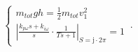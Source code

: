 \begin{equation}
    \begin{cases}
      m_{tot} g h = \frac{1}{2} m_{tot} v_1^2\\
      \left\lvert\frac{k_{p\omega}s+k_{i\omega}}{s}\cdot\frac{1}{Ts+1}\right\rvert_{S=\mathrm{j}\cdot2\pi}=1
    \end{cases}\,.
\end{equation}
